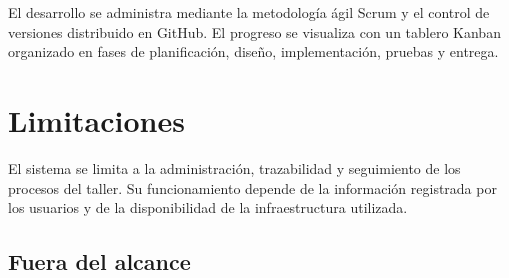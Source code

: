 El desarrollo se administra mediante la metodología ágil Scrum y el control de versiones distribuido en GitHub. El progreso se visualiza con un tablero Kanban organizado en fases de planificación, diseño, implementación, pruebas y entrega.

\section{Limitaciones}

El sistema se limita a la administración, trazabilidad y seguimiento de los procesos del taller. Su funcionamiento depende de la información registrada por los usuarios y de la disponibilidad de la infraestructura utilizada.

\subsection{Fuera del alcance}

